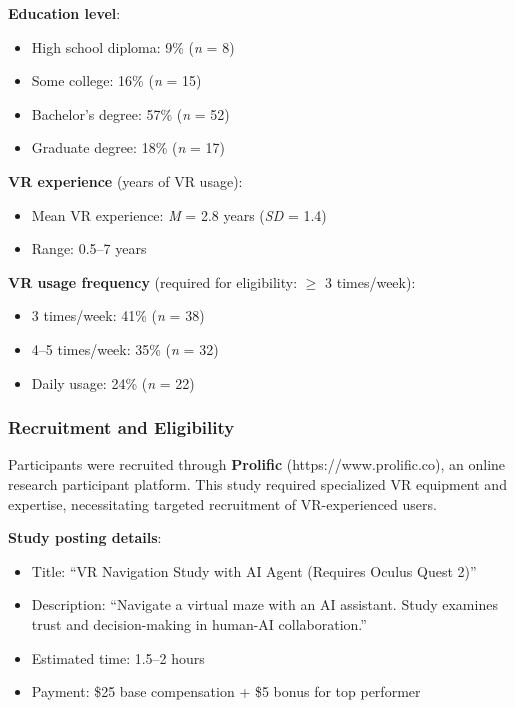 \documentclass[12pt]{article}
\begin{document}
\textbf{Education level}:
\begin{itemize}
    \item High school diploma: 9\% (\textit{n} = 8)
    \item Some college: 16\% (\textit{n} = 15)
    \item Bachelor's degree: 57\% (\textit{n} = 52)
    \item Graduate degree: 18\% (\textit{n} = 17)
\end{itemize}

\textbf{VR experience} (years of VR usage):
\begin{itemize}
    \item Mean VR experience: \textit{M} = 2.8 years (\textit{SD} = 1.4)
    \item Range: 0.5--7 years
\end{itemize}

\textbf{VR usage frequency} (required for eligibility: $\geq$ 3 times/week):
\begin{itemize}
    \item 3 times/week: 41\% (\textit{n} = 38)
    \item 4--5 times/week: 35\% (\textit{n} = 32)
    \item Daily usage: 24\% (\textit{n} = 22)
\end{itemize}

\subsubsection{Recruitment and Eligibility}

Participants were recruited through \textbf{Prolific} (https://www.prolific.co), an online research participant platform. This study required specialized VR equipment and expertise, necessitating targeted recruitment of VR-experienced users.

\textbf{Study posting details}:
\begin{itemize}
    \item Title: ``VR Navigation Study with AI Agent (Requires Oculus Quest 2)''
    \item Description: ``Navigate a virtual maze with an AI assistant. Study examines trust and decision-making in human-AI collaboration.''
    \item Estimated time: 1.5--2 hours
    \item Payment: \$25 base compensation + \$5 bonus for top performer
\end{itemize}
\end{document}
